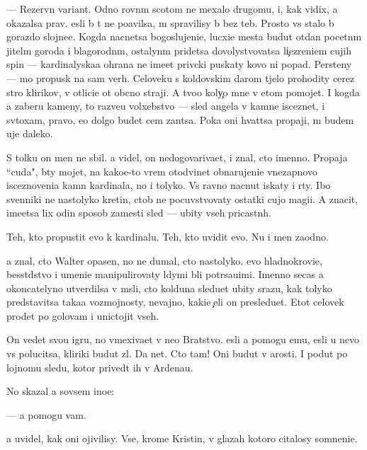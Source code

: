 \documentclass[10pt]{book}
\begin{document}
— Rezervn{\yi}{\y} variant. Odno rovn{\yi}m scotom ne mexalo drugomu, i, kak vidix, {\y}a okazalsa prav. {\Y}esli b{\yi} t{\yi} ne po{\y}avilsa, m{\yi} spravilisy b{\yi} bez teb{\ia}. Prosto vs{\e} stalo b{\yi} gorazdo slojne{\y}e. Kogda nacnetsa bogoslujeni{\y}e, lucxi{\y}e mesta budut otdan{\yi} pocetn{\yi}m jitel{\ia}m goroda i blagorodn{\yi}m, ostalyn{\yi}m pridetsa dovolystvovatsa li{\c}ezreni{\y}em cujih spin — kardinalyska{\y}a ohrana ne ime{\y}et priv{\yi}cki puskaty kovo ni popad{\ia}. Persteny — mo{\y} propusk na sam{\yi}{\y} verh. Celoveku s koldovskim darom t{\ia}jelo prohodity cerez stro{\y} klirikov, v otlici{\y}e ot ob{\yi}cno{\y} straji. A tvo{\y}o koly{\c}o mne v etom pomojet. I kogda {\y}a zaberu kameny, to razve{\y}u volxebstvo — sled angela v kamne isceznet, i sv{\ia}toxam, pravo, {\y}e{\x}o dolgo budet cem zan{\ia}tsa. Poka oni hvat{\ia}tsa propaji, m{\yi} budem uje daleko.

S tolku on men{\ia} ne sbil. {\Y}a videl, on nedogovariva{\y}et, i znal, cto imenno. Propaja ``cuda", b{\yi}ty mojet, na kako{\y}e-to vrem{\ia} otodvinet obnarujeni{\y}e vnezapnovo isceznoveni{\y}a kamn{\ia} kardinala, no i tolyko. Vs{\e} ravno nacnut iskaty i r{\yi}ty. Ibo sv{\ia}{\x}enniki ne nastolyko kretin{\yi}, ctob{\yi} ne pocuvstvovaty ostatki cujo{\y} magi{\y}i. A znacit, ime{\y}etsa lix odin sposob zamesti sled{\yi} — ubity vseh pricastn{\yi}h.

Teh, kto propustit {\y}evo k kardinalu. Teh, kto uvidit {\y}evo. Nu i men{\ia} zaodno.

{\Y}a znal, cto Walter opasen, no ne dumal, cto nastolyko. {\Y}evo hladnokrovi{\y}e, besst{\yi}dstvo i umeni{\y}e manipulirovaty l{\iu}dymi b{\yi}li potr{\ia}sa{\y}u{\x}imi. Imenno se{\y}cas {\y}a okoncatelyno utverdilsa v m{\yi}sli, cto kolduna sledu{\y}et ubity srazu, kak tolyko predstavitsa taka{\y}a vozmojnosty, nevajno, kaki{\y}e {\c}eli on presledu{\y}et. Etot celovek pro{\y}det po golovam i unictojit vseh.

On vedet svo{\y}u igru, no vmexiva{\y}et v ne{\y}o Bratstvo. {\Y}esli {\y}a pomogu {\y}emu, {\y}esli u nevo vs{\e} polucitsa, kliriki budut zl{\yi}. Da net. Cto tam! Oni budut v {\y}arosti. I po{\y}dut po lojnomu sledu, kotor{\yi}{\y} prived{\e}t ih v Ardenau.

No skazal {\y}a sovsem ino{\y}e:

— {\Y}a pomogu vam.

{\Y}a uvidel, kak oni ojivilisy. Vse, krome Kristin{\yi}, v glazah kotoro{\y} citalosy somneni{\y}e.
\end{document}
